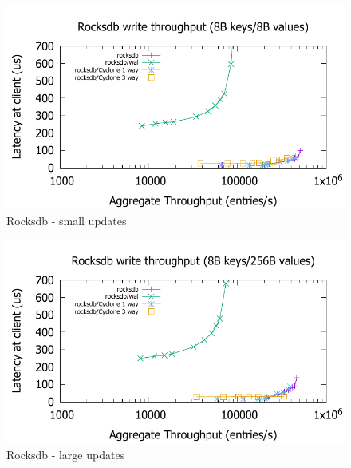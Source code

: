 \documentclass[pageno]{jpaper}
\begin{document}
\begin{figure}
\includegraphics[scale=0.6]{results2/rocksdb.pdf}
\caption{Rocksdb - small updates}
\label{fig:rocksdb}
\end{figure}

\begin{figure}
\includegraphics[scale=0.6]{results2/rocksdb_256.pdf}
\caption{Rocksdb - large updates}
\label{fig:rocksdb_256}
\end{figure}
\end{document}
